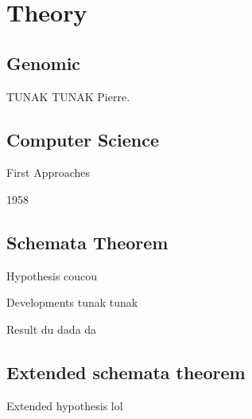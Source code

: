 \section{Theory}

\subsection{Genomic}

\begin{frame}[plain]{TUNAK TUNAK}
Pierre.
\end{frame}

\subsection{Computer Science}

\begin{frame}{First Approaches}
  \begin{block}{1958}
    \cite{fraser1958monte}
  \end{block}
\end{frame}

\subsection{Schemata Theorem}
\begin{frame}{Hypothesis}
  coucou
\end{frame}

\begin{frame}{Developments}
  tunak tunak
\end{frame}

\begin{frame}{Result}
  du dada da
\end{frame}

\subsection{Extended schemata theorem}
\begin{frame}{Extended hypothesis}
  lol
\end{frame}
